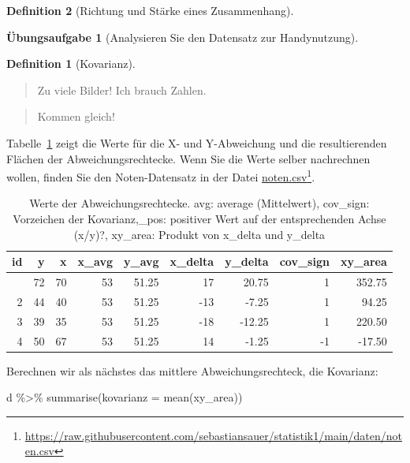 \documentclass[
  a4paper,
  DIV=11]{scrreprt}
\newenvironment{Shaded}{\begin{snugshade}}{\end{snugshade}}
\newcommand{\AttributeTok}[1]{\textcolor[rgb]{0.40,0.45,0.13}{#1}}
\newcommand{\FunctionTok}[1]{\textcolor[rgb]{0.28,0.35,0.67}{#1}}
\newcommand{\NormalTok}[1]{\textcolor[rgb]{0.00,0.23,0.31}{#1}}
\newcommand{\SpecialCharTok}[1]{\textcolor[rgb]{0.37,0.37,0.37}{#1}}
\theoremstyle{definition}
\newtheorem{exercise}{Übungsaufgabe}[chapter]
\theoremstyle{definition}
\theoremstyle{definition}
\newtheorem{definition}{Definition}[chapter]
\theoremstyle{remark}
\begin{document}
\begin{definition}[Richtung und Stärke eines
Zusammenhang]
\begin{exercise}[Analysieren Sie den Datensatz zur
Handynutzung]
\begin{definition}[Kovarianz]
\end{definition}

\begin{quote}
{} Zu viele Bilder! Ich brauch Zahlen.
\end{quote}

\begin{quote}
{} Kommen gleich!
\end{quote}

Tabelle~\ref{tbl-kov2} zeigt die Werte für die X- und Y-Abweichung und
die resultierenden Flächen der Abweichungsrechtecke. Wenn Sie die Werte
selber nachrechnen wollen, finden Sie den Noten-Datensatz in der Datei
\href{https://raw.githubusercontent.com/sebastiansauer/statistik1/main/daten/noten.csv}{noten.csv}\footnote{\url{https://raw.githubusercontent.com/sebastiansauer/statistik1/main/daten/noten.csv}}.

\begin{longtable}[]{@{}rrrrrrrrr@{}}

\caption{\label{tbl-kov2}Werte der Abweichungsrechtecke. avg: average
(Mittelwert), cov\_sign: Vorzeichen der Kovarianz,\_pos: positiver Wert
auf der entsprechenden Achse (x/y)?, xy\_area: Produkt von x\_delta und
y\_delta}

\tabularnewline

\toprule\noalign{}
id & y & x & x\_avg & y\_avg & x\_delta & y\_delta & cov\_sign &
xy\_area \\
\midrule\noalign{}
\endhead
\bottomrule\noalign{}
\endlastfoot
1 & 72 & 70 & 53 & 51.25 & 17 & 20.75 & 1 & 352.75 \\
2 & 44 & 40 & 53 & 51.25 & -13 & -7.25 & 1 & 94.25 \\
3 & 39 & 35 & 53 & 51.25 & -18 & -12.25 & 1 & 220.50 \\
4 & 50 & 67 & 53 & 51.25 & 14 & -1.25 & -1 & -17.50 \\

\end{longtable}

Berechnen wir als nächstes das mittlere Abweichungsrechteck, die
Kovarianz:

\begin{Shaded}
\begin{Highlighting}[]
\NormalTok{d }\SpecialCharTok{\%\textgreater{}\%}
  \FunctionTok{summarise}\NormalTok{(}\AttributeTok{kovarianz =} \FunctionTok{mean}\NormalTok{(xy\_area))}
\end{Highlighting}
\end{Shaded}


\end{exercise}
\end{definition}
\end{document}

